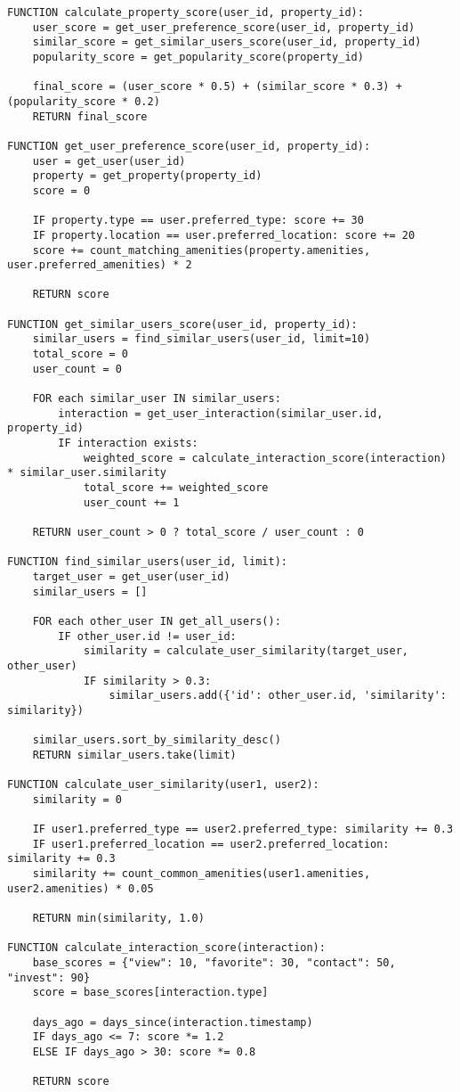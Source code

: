 \begin{verbatim}
FUNCTION calculate_property_score(user_id, property_id):
    user_score = get_user_preference_score(user_id, property_id)
    similar_score = get_similar_users_score(user_id, property_id)
    popularity_score = get_popularity_score(property_id)
    
    final_score = (user_score * 0.5) + (similar_score * 0.3) + (popularity_score * 0.2)
    RETURN final_score

FUNCTION get_user_preference_score(user_id, property_id):
    user = get_user(user_id)
    property = get_property(property_id)
    score = 0
    
    IF property.type == user.preferred_type: score += 30
    IF property.location == user.preferred_location: score += 20
    score += count_matching_amenities(property.amenities, user.preferred_amenities) * 2
    
    RETURN score

FUNCTION get_similar_users_score(user_id, property_id):
    similar_users = find_similar_users(user_id, limit=10)
    total_score = 0
    user_count = 0
    
    FOR each similar_user IN similar_users:
        interaction = get_user_interaction(similar_user.id, property_id)
        IF interaction exists:
            weighted_score = calculate_interaction_score(interaction) * similar_user.similarity
            total_score += weighted_score
            user_count += 1
    
    RETURN user_count > 0 ? total_score / user_count : 0

FUNCTION find_similar_users(user_id, limit):
    target_user = get_user(user_id)
    similar_users = []
    
    FOR each other_user IN get_all_users():
        IF other_user.id != user_id:
            similarity = calculate_user_similarity(target_user, other_user)
            IF similarity > 0.3:
                similar_users.add({'id': other_user.id, 'similarity': similarity})
    
    similar_users.sort_by_similarity_desc()
    RETURN similar_users.take(limit)

FUNCTION calculate_user_similarity(user1, user2):
    similarity = 0
    
    IF user1.preferred_type == user2.preferred_type: similarity += 0.3
    IF user1.preferred_location == user2.preferred_location: similarity += 0.3
    similarity += count_common_amenities(user1.amenities, user2.amenities) * 0.05
    
    RETURN min(similarity, 1.0)

FUNCTION calculate_interaction_score(interaction):
    base_scores = {"view": 10, "favorite": 30, "contact": 50, "invest": 90}
    score = base_scores[interaction.type]
    
    days_ago = days_since(interaction.timestamp)
    IF days_ago <= 7: score *= 1.2
    ELSE IF days_ago > 30: score *= 0.8
    
    RETURN score
\end{verbatim}

